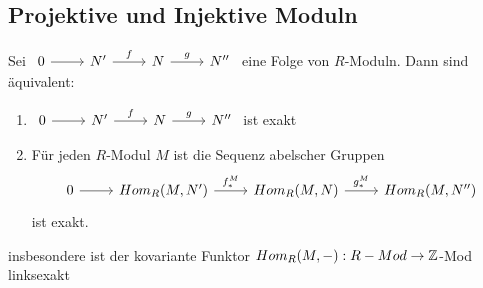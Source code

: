 \subsection{Projektive und Injektive Moduln}
\begin{sa}\label{6.1}
	Sei $\begin{tikzcd}
	0  \arrow{r} & N' \arrow{r}{f} & N \arrow{r}{g} & N'' 
	\end{tikzcd} $ eine Folge von $R$-Moduln. Dann sind äquivalent: 
	\begin{enumerate} [label= \roman*)]
		\item $\begin{tikzcd}
		0  \arrow{r} & N' \arrow{r}{f} & N \arrow{r}{g} & N'' 
		\end{tikzcd} $ ist exakt
		\item Für jeden $R$-Modul $M$ ist die Sequenz abelscher Gruppen  $$\begin{tikzcd}
		0  \arrow{r} & Hom_{R}(M,N') \arrow{r}{f_{*}^{M}} & Hom_{R}(M,N)  \arrow{r}{g_{*}^{M}} & Hom_{R}(M,N'') 
		\end{tikzcd} $$ ist exakt.
	\end{enumerate}
	insbesondere ist der kovariante Funktor $Hom_R(M,-): R-Mod \to \mathbb{Z}$-Mod linksexakt
\end{sa}
